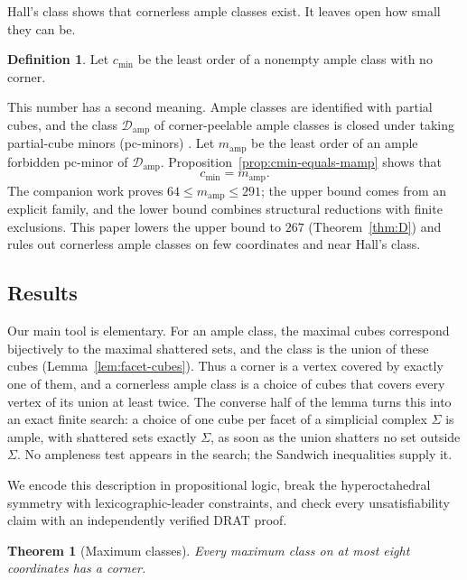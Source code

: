 \documentclass[11pt]{article}
\numberwithin{equation}{section}
\newtheorem{maintheorem}{Theorem}
\theoremstyle{definition}
\newtheorem{definition}[theorem]{Definition}
\theoremstyle{remark}
\newcommand{\Damp}{\mathcal D_{\mathrm{amp}}}
\newcommand{\cmin}{c_{\min}}
\newcommand{\mamp}{m_{\mathrm{amp}}}
\begin{document}
Hall's class shows that cornerless ample classes exist.  It leaves open how
small they can be.

\begin{definition}
\label{def:cmin}
Let \(\cmin\) be the least order of a nonempty ample class with no corner.
\end{definition}

This number has a second meaning.  Ample classes are identified with
partial cubes, and the class \(\Damp\) of corner-peelable ample classes is
closed under taking partial-cube minors (pc-minors)
\cite{KnauerMarc20,BousquetDampReader}.  Let \(\mamp\) be the least order of
an ample forbidden pc-minor of \(\Damp\).
Proposition~\ref{prop:cmin-equals-mamp} shows that
\[
 \cmin=\mamp .
\]
The companion work \cite{BousquetDampReader} proves
\(64\le\mamp\le291\); the upper bound comes from an explicit family, and
the lower bound combines structural reductions with finite exclusions.
This paper lowers the upper bound to \(267\) (Theorem~\ref{thm:D}) and rules
out cornerless ample classes on few coordinates and near Hall's class.

\subsection{Results}

Our main tool is elementary.  For an ample class, the maximal cubes
correspond bijectively to the maximal shattered sets, and the class is the
union of these cubes (Lemma~\ref{lem:facet-cubes}).  Thus a corner is a
vertex covered by exactly one of them, and a cornerless ample class is a
choice of cubes that covers every vertex of its union at least twice.  The
converse half of the lemma turns this into an exact finite search: a
choice of one cube per facet of a simplicial complex \(\Sigma\) is ample,
with shattered sets exactly \(\Sigma\), as soon as the union shatters no
set outside \(\Sigma\).  No ampleness test appears in the search; the
Sandwich inequalities supply it.

We encode this description in propositional logic, break the
hyperoctahedral symmetry with lexicographic-leader constraints, and check
every unsatisfiability claim with an independently verified DRAT proof.

\begin{maintheorem}[Maximum classes]
\label{thm:A}
Every maximum class on at most eight coordinates has a corner.
\end{maintheorem}
\end{document}
